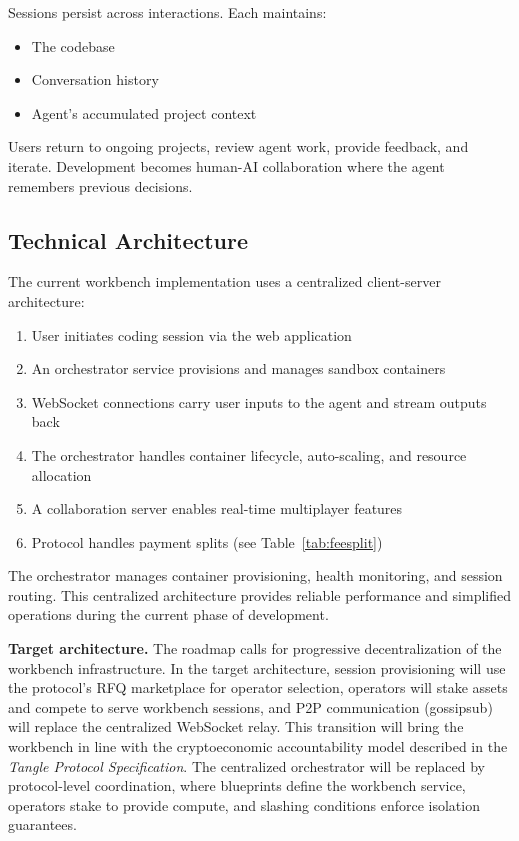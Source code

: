\documentclass[11pt,a4paper]{article}
\begin{document}
Sessions persist across interactions. Each maintains:

\begin{itemize}[noitemsep]
    \item The codebase
    \item Conversation history
    \item Agent's accumulated project context
\end{itemize}

Users return to ongoing projects, review agent work, provide feedback, and iterate. Development becomes human-AI collaboration where the agent remembers previous decisions.

\subsection{Technical Architecture}

The current workbench implementation uses a centralized client-server architecture:

\begin{enumerate}[noitemsep]
    \item User initiates coding session via the web application
    \item An orchestrator service provisions and manages sandbox containers
    \item WebSocket connections carry user inputs to the agent and stream outputs back
    \item The orchestrator handles container lifecycle, auto-scaling, and resource allocation
    \item A collaboration server enables real-time multiplayer features
    \item Protocol handles payment splits (see Table~\ref{tab:feesplit})
\end{enumerate}

The orchestrator manages container provisioning, health monitoring, and session routing. This centralized architecture provides reliable performance and simplified operations during the current phase of development.

\textbf{Target architecture.} The roadmap calls for progressive decentralization of the workbench infrastructure. In the target architecture, session provisioning will use the protocol's RFQ marketplace for operator selection, operators will stake assets and compete to serve workbench sessions, and P2P communication (gossipsub) will replace the centralized WebSocket relay. This transition will bring the workbench in line with the cryptoeconomic accountability model described in the \textit{Tangle Protocol Specification}. The centralized orchestrator will be replaced by protocol-level coordination, where blueprints define the workbench service, operators stake to provide compute, and slashing conditions enforce isolation guarantees.
\end{document}
